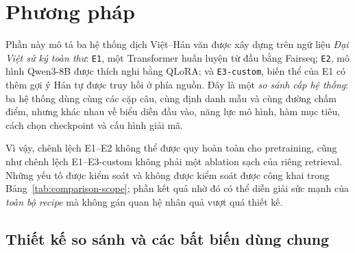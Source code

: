 
\usetikzlibrary{arrows.meta,positioning,calc,shapes.geometric}

\section{Phương pháp}

Phần này mô tả ba hệ thống dịch Việt--Hán văn được xây dựng trên ngữ liệu
\emph{Đại Việt sử ký toàn thư}: \texttt{E1}, một Transformer huấn luyện từ
đầu bằng Fairseq; \texttt{E2}, mô hình Qwen3-8B được thích nghi bằng QLoRA;
và \texttt{E3-custom}, biến thể của E1 có thêm gợi ý Hán tự được truy hồi ở
phía nguồn. Đây là một \emph{so sánh cấp hệ thống}: ba hệ thống dùng cùng các
cặp câu, cùng định danh mẫu và cùng đường chấm điểm, nhưng khác nhau về biểu
diễn đầu vào, năng lực mô hình, hàm mục tiêu, cách chọn checkpoint và cấu hình
giải mã.

Vì vậy, chênh lệch E1--E2 không thể được quy hoàn toàn cho pretraining, cũng
như chênh lệch E1--E3-custom không phải một ablation sạch của riêng retrieval.
Những yếu tố được kiểm soát và không được kiểm soát được công khai trong
Bảng~\ref{tab:comparison-scope}; phần kết quả nhờ đó có thể diễn giải sức mạnh
của \emph{toàn bộ recipe} mà không gán quan hệ nhân quả vượt quá thiết kế.

\subsection{Thiết kế so sánh và các bất biến dùng chung}

